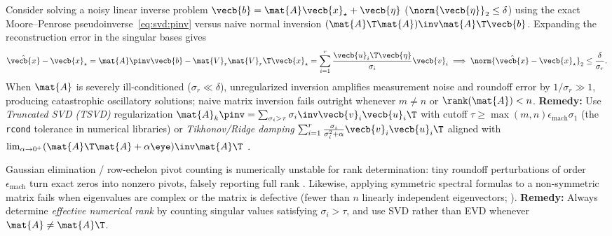 \documentclass[../../../../master.tex]{subfiles}
\begin{document}
\begin{pitfall}
Consider solving a noisy linear inverse problem $\vecb{b} = \mat{A}\vecb{x}_\star + \vecb{\eta}$ ($\norm{\vecb{\eta}}_2 \le \delta$) using the exact Moore--Penrose pseudoinverse~\eqref{eq:svd:pinv} versus naive normal inversion $(\mat{A}\T\mat{A})\inv\mat{A}\T\vecb{b}$. Expanding the reconstruction error in the singular bases gives
\[
  \hat{\vecb{x}} - \vecb{x}_\star = \mat{A}\pinv\vecb{b} - \mat{V}_r\mat{V}_r\T\vecb{x}_\star = \sum_{i=1}^r \frac{\vecb{u}_i\T \vecb{\eta}}{\sigma_i} \vecb{v}_i
  \implies \norm{\hat{\vecb{x}} - \vecb{x}_\star}_2 \le \frac{\delta}{\sigma_r}.
\]
When $\mat{A}$ is severely ill-conditioned ($\sigma_r \ll \delta$), unregularized inversion amplifies measurement noise and roundoff error by $1/\sigma_r \gg 1$, producing catastrophic oscillatory solutions; naive matrix inversion fails outright whenever $m \neq n$ or $\rank(\mat{A}) < n$. \textbf{Remedy:} Use \emph{Truncated SVD (TSVD)} regularization $\mat{A}_k\pinv = \sum_{\sigma_i > \tau} \sigma_i\inv \vecb{v}_i\vecb{u}_i\T$ with cutoff $\tau \ge \max(m,n)\epsilon_{\text{mach}}\sigma_1$ (the \texttt{rcond} tolerance in numerical libraries) or \emph{Tikhonov/Ridge damping} $\sum_{i=1}^r \frac{\sigma_i}{\sigma_i^2 + \alpha}\vecb{v}_i\vecb{u}_i\T$ aligned with $\lim_{\alpha \to 0^+} (\mat{A}\T\mat{A}+\alpha\eye)\inv\mat{A}\T$ .
\end{pitfall}

\begin{pitfall}
Gaussian elimination / row-echelon pivot counting is numerically unstable for rank determination: tiny roundoff perturbations of order $\epsilon_{\text{mach}}$ turn exact zeros into nonzero pivots, falsely reporting full rank . Likewise, applying symmetric spectral formulas to a non-symmetric matrix fails when eigenvalues are complex or the matrix is defective (fewer than $n$ linearly independent eigenvectors; ). \textbf{Remedy:} Always determine \emph{effective numerical rank} by counting singular values satisfying $\sigma_i > \tau$, and use SVD rather than EVD whenever $\mat{A} \neq \mat{A}\T$.
\end{pitfall}
\end{document}
